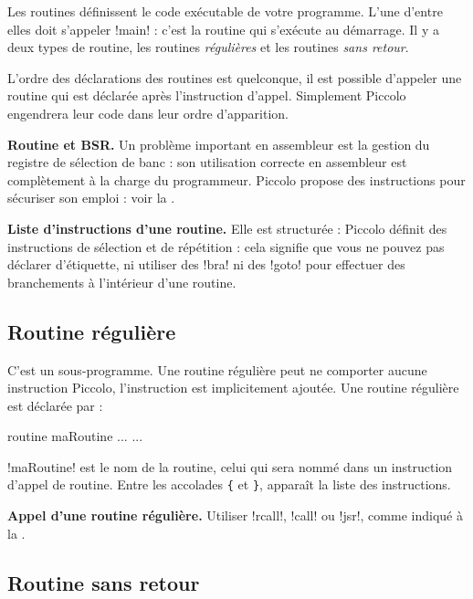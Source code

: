 
Les routines définissent le code exécutable de votre programme. L’une d’entre elles doit s’appeler \pic!main! : c’est la routine qui s’exécute au démarrage. Il y a deux types de routine, les routines \emph{régulières} et les routines \emph{sans retour}.


L’ordre des déclarations des routines est quelconque, il est possible d’appeler une routine qui est déclarée après l’instruction d’appel. Simplement Piccolo engendrera leur code dans leur ordre d’apparition. 

\textbf{Routine et BSR.} Un problème important en assembleur est la gestion du registre de sélection de banc  : son utilisation correcte en assembleur est complètement à la charge du programmeur. Piccolo propose des instructions pour sécuriser son emploi : voir la .

\textbf{Liste d’instructions d’une routine.} Elle est structurée : Piccolo définit des instructions de sélection et de répétition : cela signifie que vous ne pouvez pas déclarer d’étiquette, ni utiliser des \pic!bra! ni des \pic!goto! pour effectuer des branchements à l’intérieur d’une routine.


\subsection{Routine régulière}

C'est un sous-programme. Une routine régulière peut ne comporter aucune instruction Piccolo, l'instruction  est implicitement ajoutée. Une routine régulière est déclarée par :
\begin{piccolo}
routine maRoutine ... {
  ...
}
\end{piccolo}

\pic!maRoutine! est le nom de la routine, celui qui sera nommé dans un instruction d’appel de routine. Entre les accolades \texttt{\{} et \texttt{\}}, apparaît la liste des instructions.

\textbf{Appel d’une routine régulière.} Utiliser \pic!rcall!, \pic!call! ou \pic!jsr!, comme indiqué à la .

\subsection{Routine sans retour}


